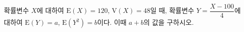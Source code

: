 확률변수 $X$에 대하여 $\mathrm{E}(X)=120$, $\mathrm{V}(X)=48$일 때, 확률변수 $Y=\dfrac{X-100}{4}$에 대하여 $\mathrm{E}(Y)=a$, $\mathrm{E}(Y^2)=b$이다. 이때 $a+b$의 값을 구하시오. 
